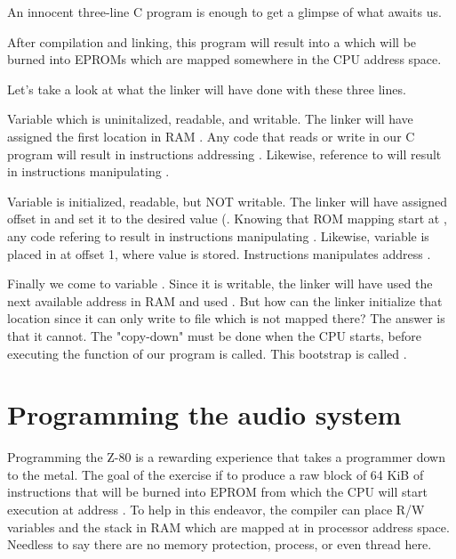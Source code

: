 An innocent three-line C program is enough to get a glimpse of what awaits us.



After compilation and linking, this program will result into a  which will be burned into EPROMs which are mapped somewhere in the CPU address space.


Let's take a look at what the linker will have done with these three lines.

Variable  which is uninitalized, readable, and writable. The linker will have assigned the first location in RAM . Any code that reads or write  in our C program will result in instructions addressing . Likewise, reference to  will result in instructions manipulating .

Variable   is initialized, readable, but NOT writable. The linker will have assigned offset  in  and set it to the desired value (. Knowing that ROM mapping start at , any code refering to  result in instructions manipulating . Likewise, variable  is placed in  at offset 1, where value  is stored. Instructions manipulates address .

Finally we come to variable . Since it is writable, the linker will have used the next available address in RAM and used . But how can the linker initialize that location since it can only write to file  which is not mapped there? The answer is that it cannot. The "copy-down" must be done when the CPU starts, before executing the  function of our program is called. This bootstrap is called .
\pagebreak

\section{Programming the audio system}
Programming the Z-80 is a rewarding experience that takes a programmer down to the metal. The goal of the exercise if to produce a raw block of 64 KiB of instructions that will be burned into EPROM from which the CPU will start execution at address . To help in this endeavor, the compiler can place R/W variables and the stack in RAM which are mapped at  in processor address space. Needless to say there are no memory protection, process, or even thread here.

